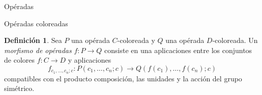 \documentclass[12pt,aspectratio=169]{beamer}
\numberwithin{equation}{section}
\theoremstyle{definition}
\newtheorem{defi}[teo]{Definici\'on}
\begin{document}
{\begin{frame}{Op\'eradas}
\end{frame}

\begin{frame}{Op\'eradas coloreadas}
    \begin{defi}
        Sea $P$ una op\'erada $C$-coloreada y $Q$ una op\'erada $D$-coloreada. Un \emph{morfismo de op\'eradas} $f\colon P\to Q$ consiste en una aplicaciones entre los conjuntos de colores $f\colon C\to D$ y aplicaciones
        $$
            f_{c_1,\dots,c_n;c}: P(c_1,\dots,c_n;c) \longrightarrow Q(f(c_1),\dots,f(c_n);c)
        $$
        compatibles con el producto composici\'on, las unidades y la acci\'on del grupo sim\'etrico.
    \end{defi}

\end{frame}

}
\end{document}
